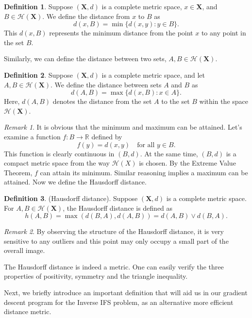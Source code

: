 \documentclass[a4paper,11pt, titlepage]{article}
\theoremstyle{definition}
\newtheorem{definition}{Definition}[section]
\theoremstyle{plain}
\theoremstyle{remark}
\newtheorem*{remark}{Remark}
\theoremstyle{definition}
\begin{document}
\begin{definition}
Suppose $(\mathbf{X}, d)$ is a complete metric space, $x \in \mathbf{X}$, and $B \in \mathcal{H}(\mathbf{X})$. We define the distance from $x$ to $B$ as
\[
d(x, B) = \min\{d(x, y) : y \in B\}.
\]
This $d(x, B)$ represents the minimum distance from the point $x$ to any point in the set $B$.
\end{definition}

Similarly, we can define the distance between two sets, $A, B \in \mathcal{H}(\mathbf{X})$.
\begin{definition}
Suppose $(\mathbf{X}, d)$ is a complete metric space, and let $A, B \in \mathcal{H}(\mathbf{X})$. We define the distance between sets $A$ and $B$ as
\[d(A, B) = \max\{d(x, B) : x \in A\}.\]
Here, $d(A, B)$ denotes the distance from the set $A$ to the set $B$ within the space $\mathcal{H}(\mathbf{X})$.
\end{definition}

\begin{remark}
It is obvious that the minimum and maximum can be attained. Let's examine a function \( f: B \rightarrow \mathbb{R} \) defined by
\[
f(y) = d(x, y) \quad \text{for all } y \in B.
\]
This function is clearly continuous in $(B, d)$. At the same time, $(B, d)$ is a compact metric space from the way $\mathcal{H}(X)$ is chosen. By the Extreme Value Theorem, $f$ can attain its minimum. Similar reasoning implies a maximum can be attained. Now we define the Hausdorff distance.
\end{remark}

\begin{definition}{(Hausdorff distance).}
Suppose $(\mathbf{X}, d)$ is a complete metric space. For $A, B \in \mathcal{H}(\mathbf{X})$, the Hausdorff distance is defined as
\[
h(A, B) = \max(d(B, A), d(A, B))= d(A, B) \lor d(B, A).
\]
\end{definition}
\begin{remark}
By observing the structure of the Hausdorff distance, it is very sensitive to any outliers and this point may only occupy a small part of the overall image.
\end{remark}

The Hausdorff distance is indeed a metric. One can easily verify the three properties of positivity, symmetry and the triangle inequality.

Next, we briefly introduce an important definition that will aid us in our gradient descent program for the Inverse IFS problem, as an alternative more efficient distance metric.
\end{document}
